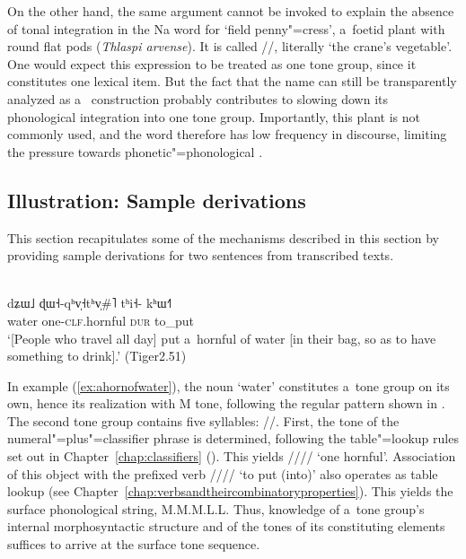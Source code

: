 On the other hand, the same argument cannot be invoked to explain the absence of tonal integration in the Na word for ‘field penny"=cress’, a~foetid plant with round flat pods (\textit{Thlaspi
  arvense}). It is called //, literally ‘the crane’s vegetable’. One would expect this expression to be treated as one tone group, since it constitutes one lexical item. But the
fact that the name can still be transparently analyzed as a~ construction probably
contributes to slowing down its phonological integration into one tone group. Importantly, this plant is not commonly used, and the word therefore has low frequency in discourse, limiting the pressure towards phonetic"=phonological .


\subsection{Illustration: Sample derivations}
\label{sec:samplederivation}

This section recapitulates some of the mechanisms described in this section by providing sample derivations for two sentences from transcribed texts. 

\begin{exe}
	\ex
	\label{ex:ahornofwater}
	\\
	\gll dʑɯ˩	ɖɯ˧-qʰv̩˧tʰv̩\#˥	tʰi˧-	kʰɯ˧˥\\
	water	one-\textsc{clf}.hornful	\textsc{dur}	to\_put\\
	\glt ‘[People who travel all day] put a~hornful of water [in their bag, so as to have something to
	drink].’ (Tiger2.51)
\end{exe}

In example (\ref{ex:ahornofwater}), the noun ‘water’ constitutes a~tone group on its own, hence its realization with M tone, following the regular pattern shown in . The second tone group
contains five syllables: //. First, the tone of the
numeral"=plus"=classifier phrase is determined, following the table"=lookup rules set out in Chapter~\ref{chap:classifiers} (). This yields //// ‘one hornful’. Association of this object with the prefixed verb //// ‘to put (into)’ also operates as table lookup (see Chapter~\ref{chap:verbsandtheircombinatoryproperties}). This yields
the surface phonological string, M.M.M.L.L. Thus, knowledge of a~tone group's internal morphosyntactic structure and of the tones of its constituting elements suffices to arrive at the surface tone sequence.

